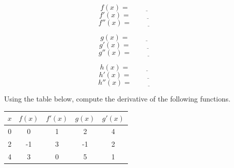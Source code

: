 \documentclass{siproblemset}
\begin{document}
\begin{multipartquestion}
\begin{multicols}{3}
\begin{center}
            \end{center}
        \end{multicols}
        \vspace{-1cm}
        \begin{multicols}{3}
            \begin{center}
                $$f(x)=\underline{\hspace{2cm}}$$
                $$f'(x)=\underline{\hspace{2cm}}$$
                $$f''(x)=\underline{\hspace{2cm}}$$
            \end{center}
            \begin{center}
                $$g(x)=\underline{\hspace{2cm}}$$
                $$g'(x)=\underline{\hspace{2cm}}$$
                $$g''(x)=\underline{\hspace{2cm}}$$
            \end{center}
            \begin{center}
                $$h(x)=\underline{\hspace{2cm}}$$
                $$h'(x)=\underline{\hspace{2cm}}$$
                $$h''(x)=\underline{\hspace{2cm}}$$
            \end{center}
        \end{multicols}
    \end{multipartquestion}
    \newpage
    
    \begin{multipartquestion}{Using the table below, compute the derivative of the following functions.}
        
        \begin{center}
            \begin{tabular}{|c|c|c|c|c|}
                \hline
                \textbf{$x$} & \textbf{$f(x)$} & \textbf{$f'(x)$} & \textbf{$g(x)$} & \textbf{$g'(x)$} \\ \hline
                     0       &        0        &        1         &        2        &        4         \\ \hline
                     2       &       -1        &        3         &       -1        &        2         \\ \hline
                     4       &        3        &        0         &        5        &        1         \\ \hline
            \end{tabular}
        \end{center}
    
        \Smallsp
        \Smallsp
        \Smallsp
        \Smallsp
        
    \end{multipartquestion}
    \newpage
    
\end{document}
